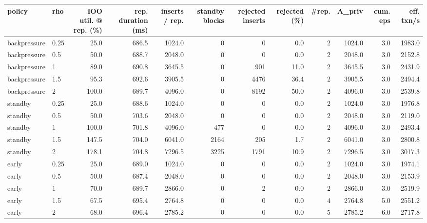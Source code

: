 \begin{tabular}{llrrrrrrrrrr}
\toprule
policy & rho & IOO util. @ rep. (\%) & rep. duration (ms) & inserts / rep. & standby blocks & rejected inserts & rejected (\%) & #rep. & A\_priv & cum. eps & eff. txn/s \\
\midrule
backpressure & 0.25 & 25.0 & 686.5 & 1024.0 & 0 & 0 & 0.0 & 2 & 1024.0 & 3.0 & 1983.0 \\
backpressure & 0.5 & 50.0 & 688.7 & 2048.0 & 0 & 0 & 0.0 & 2 & 2048.0 & 3.0 & 2152.8 \\
backpressure & 1 & 89.0 & 690.8 & 3645.5 & 0 & 901 & 11.0 & 2 & 3645.5 & 3.0 & 2431.9 \\
backpressure & 1.5 & 95.3 & 692.6 & 3905.5 & 0 & 4476 & 36.4 & 2 & 3905.5 & 3.0 & 2494.4 \\
backpressure & 2 & 100.0 & 689.7 & 4096.0 & 0 & 8192 & 50.0 & 2 & 4096.0 & 3.0 & 2539.8 \\
standby & 0.25 & 25.0 & 688.6 & 1024.0 & 0 & 0 & 0.0 & 2 & 1024.0 & 3.0 & 1976.8 \\
standby & 0.5 & 50.0 & 703.6 & 2048.0 & 0 & 0 & 0.0 & 2 & 2048.0 & 3.0 & 2119.0 \\
standby & 1 & 100.0 & 701.8 & 4096.0 & 477 & 0 & 0.0 & 2 & 4096.0 & 3.0 & 2493.4 \\
standby & 1.5 & 147.5 & 704.0 & 6041.0 & 2164 & 205 & 1.7 & 2 & 6041.0 & 3.0 & 2800.8 \\
standby & 2 & 178.1 & 704.8 & 7296.5 & 3225 & 1791 & 10.9 & 2 & 7296.5 & 3.0 & 3017.3 \\
early & 0.25 & 25.0 & 689.0 & 1024.0 & 0 & 0 & 0.0 & 2 & 1024.0 & 3.0 & 1974.1 \\
early & 0.5 & 50.0 & 687.4 & 2048.0 & 0 & 0 & 0.0 & 2 & 2048.0 & 3.0 & 2153.9 \\
early & 1 & 70.0 & 689.7 & 2866.0 & 0 & 2 & 0.0 & 2 & 2866.0 & 3.0 & 2519.9 \\
early & 1.5 & 67.5 & 695.4 & 2764.8 & 0 & 0 & 0.0 & 4 & 2764.8 & 5.0 & 2551.2 \\
early & 2 & 68.0 & 696.4 & 2785.2 & 0 & 0 & 0.0 & 5 & 2785.2 & 6.0 & 2717.8 \\
\bottomrule
\end{tabular}
